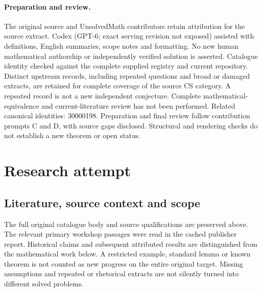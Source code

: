 \documentclass[11pt]{article}
\begin{document}
\paragraph{Preparation and review.}
The original source and UnsolvedMath contributors retain attribution for the source extract. Codex (GPT-6; exact serving revision not exposed) assisted with definitions, English summaries, scope notes and formatting. No new human mathematical authorship or independently verified solution is asserted. Catalogue identity checked against the complete supplied registry and current repository. Distinct upstream records, including repeated questions and broad or damaged extracts, are retained for complete coverage of the source CS category. A repeated record is not a new independent conjecture. Complete mathematical-equivalence and current-literature review has not been performed. Related canonical identities: 30000198. Preparation and final review follow contribution prompts C and D, with source gaps disclosed. Structural and rendering checks do not establish a new theorem or open status.
\label{end:statement}

\section{Research attempt}
\subsection{Literature, source context and scope}
The full original catalogue body and source qualifications are preserved above. The relevant primary workshop passages were read in the cached publisher report. Historical claims and subsequent attributed results are distinguished from the mathematical work below. A restricted example, standard lemma or known theorem is not counted as new progress on the entire original target. Missing assumptions and repeated or rhetorical extracts are not silently turned into different solved problems.
\end{document}
